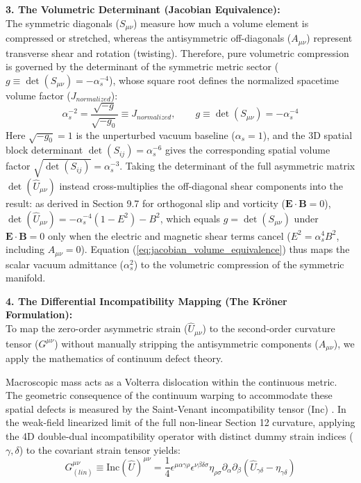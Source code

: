 \textbf{3. The Volumetric Determinant (Jacobian Equivalence):} \\
The symmetric diagonals ($S_{\mu\nu}$) measure how much a volume element is compressed or stretched, whereas the antisymmetric off-diagonals ($A_{\mu\nu}$) represent transverse shear and rotation (twisting). Therefore, pure volumetric compression is governed by the determinant of the symmetric metric sector ($g \equiv \det(S_{\mu\nu}) = -\alpha_s^{-4}$), whose square root defines the normalized spacetime volume factor ($J_{normalized}$):
\begin{equation}
    \alpha_s^{-2} = \frac{\sqrt{-g}}{\sqrt{-g_0}} \equiv J_{normalized}, \qquad g \equiv \det(S_{\mu\nu}) = -\alpha_s^{-4} \label{eq:jacobian_volume_equivalence}
\end{equation}
Here $\sqrt{-g_0} = 1$ is the unperturbed vacuum baseline ($\alpha_s = 1$), and the 3D spatial block determinant $\det(S_{ij}) = \alpha_s^{-6}$ gives the corresponding spatial volume factor $\sqrt{\det(S_{ij})} = \alpha_s^{-3}$. Taking the determinant of the full asymmetric matrix $\det(\hat{U}_{\mu\nu})$ instead cross-multiplies the off-diagonal shear components into the result: as derived in Section 9.7 for orthogonal slip and vorticity ($\mathbf{E}\cdot\mathbf{B} = 0$), $\det(\hat{U}_{\mu\nu}) = -\alpha_s^{-4}(1 - E^2) - B^2$, which equals $g = \det(S_{\mu\nu})$ under $\mathbf{E}\cdot\mathbf{B} = 0$ only when the electric and magnetic shear terms cancel ($E^2 = \alpha_s^4 B^2$, including $A_{\mu\nu} = 0$). Equation (\ref{eq:jacobian_volume_equivalence}) thus maps the scalar vacuum admittance ($\alpha_s^2$) to the volumetric compression of the symmetric manifold.



\vspace{0.2 cm}

\textbf{4. The Differential Incompatibility Mapping (The Kr\"{o}ner Formulation):} \\
To map the zero-order asymmetric strain ($\hat{U}_{\mu\nu}$) to the second-order curvature tensor ($G^{\mu\nu}$) without manually stripping the antisymmetric components ($A_{\mu\nu}$), we apply the mathematics of continuum defect theory.

Macroscopic mass acts as a Volterra dislocation \cite{volterra1907equilibre} within the continuous metric. The geometric consequence of the continuum warping to accommodate these spatial defects is measured by the Saint-Venant incompatibility tensor ($\text{Inc}$) \cite{saint1864memoire,Landau1986}. In the weak-field linearized limit of the full non-linear Section 12 curvature, applying the 4D double-dual incompatibility operator with distinct dummy strain indices ($\gamma, \delta$) to the covariant strain tensor yields: %
\begin{equation}
    G^{\mu\nu}_{(lin)} \equiv \text{Inc}(\hat{U})^{\mu\nu} = \frac{1}{4} \epsilon^{\mu\alpha\gamma\rho} \epsilon^{\nu\beta\delta\sigma} \eta_{\rho\sigma} \partial_\alpha \partial_\beta (\hat{U}_{\gamma\delta} - \eta_{\gamma\delta}) \label{eq:kroner_incompatibility} %
\end{equation}

